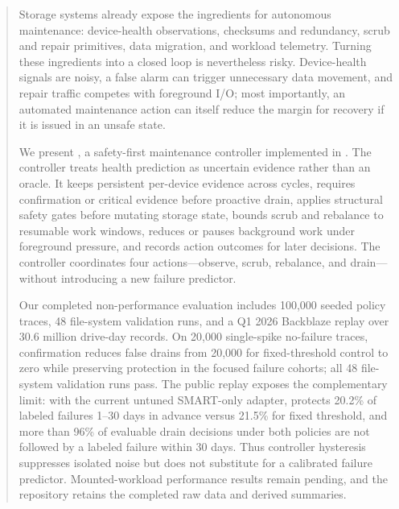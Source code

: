 \begin{abstract}
Storage systems already expose the ingredients for autonomous maintenance: device-health observations, checksums and redundancy, scrub and repair primitives, data migration, and workload telemetry. Turning these ingredients into a closed loop is nevertheless risky. Device-health signals are noisy, a false alarm can trigger unnecessary data movement, and repair traffic competes with foreground I/O; most importantly, an automated maintenance action can itself reduce the margin for recovery if it is issued in an unsafe state.

We present \autopilot{}, a safety-first maintenance controller implemented in \argosfs{}. The controller treats health prediction as uncertain evidence rather than an oracle. It keeps persistent per-device evidence across cycles, requires confirmation or critical evidence before proactive drain, applies structural safety gates before mutating storage state, bounds scrub and rebalance to resumable work windows, reduces or pauses background work under foreground pressure, and records action outcomes for later decisions. The controller coordinates four actions---observe, scrub, rebalance, and drain---without introducing a new failure predictor.

Our completed non-performance evaluation includes 100,000 seeded policy traces, 48 file-system validation runs, and a Q1 2026 Backblaze replay over 30.6 million drive-day records. On 20,000 single-spike no-failure traces, confirmation reduces false drains from 20,000 for fixed-threshold control to zero while preserving protection in the focused failure cohorts; all 48 file-system validation runs pass. The public replay exposes the complementary limit: with the current untuned SMART-only adapter, \autopilot{} protects 20.2\% of labeled failures 1--30 days in advance versus 21.5\% for fixed threshold, and more than 96\% of evaluable drain decisions under both policies are not followed by a labeled failure within 30 days. Thus controller hysteresis suppresses isolated noise but does not substitute for a calibrated failure predictor. Mounted-workload performance results remain pending, and the repository retains the completed raw data and derived summaries.
\end{abstract}
